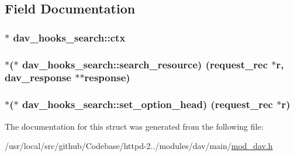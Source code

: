 \subsection{Field Documentation}
\subsubsection[{\texorpdfstring{ctx}{ctx}}]{$\ast$ dav\+\_\+hooks\+\_\+search\+::ctx}\hypertarget{structdav__hooks__search_a67f25880175eb88d81064560562e96ee}{}\label{structdav__hooks__search_a67f25880175eb88d81064560562e96ee}
\subsubsection[{\texorpdfstring{search\+\_\+resource}{search_resource}}]{$\ast$($\ast$ dav\+\_\+hooks\+\_\+search\+::search\+\_\+resource) ({\bf request\+\_\+rec} $\ast${\bf r}, {\bf dav\+\_\+response} $\ast$$\ast${\bf response})}\hypertarget{structdav__hooks__search_ab103e08ba5a91b0efe84de88ccb93cd6}{}\label{structdav__hooks__search_ab103e08ba5a91b0efe84de88ccb93cd6}
\subsubsection[{\texorpdfstring{set\+\_\+option\+\_\+head}{set_option_head}}]{$\ast$($\ast$ dav\+\_\+hooks\+\_\+search\+::set\+\_\+option\+\_\+head) ({\bf request\+\_\+rec} $\ast${\bf r})}\hypertarget{structdav__hooks__search_a641fc2e2c2298ac248e60f8a3737ad97}{}\label{structdav__hooks__search_a641fc2e2c2298ac248e60f8a3737ad97}


The documentation for this struct was generated from the following file\+:\begin{DoxyCompactItemize}
\item 
/usr/local/src/github/\+Codebase/httpd-\/2../modules/dav/main/\hyperlink{mod__dav_8h}{mod\+\_\+dav.\+h}\end{DoxyCompactItemize}
